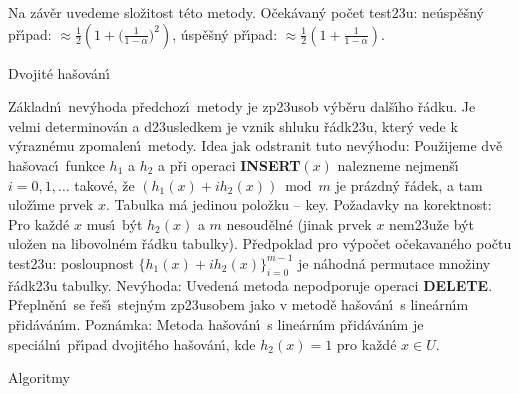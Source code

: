 \flushpar Na z\'av\v er uvedeme slo\v zitost t\'eto metody. O\v cek\'avan\'y 
po\v cet test\accent23u:\newline 
\phantom{---}ne\'usp\v e\v sn\'y p\v r\'\i pad: $\approx\frac 12(1+\big(\frac 
1{1-\alpha}\big)^2)$, \newline 
\phantom{---}\'usp\v e\v sn\'y p\v r\'\i pad: $\approx\frac 12(1+\frac 1{1-\alpha}
)$.

\heading
Dvojit\'e ha\v sov\'an\'\i
\endheading

\flushpar Z\'akladn\'\i\ nev\'yhoda p\v redchoz\'\i\ metody je zp\accent23usob 
v\'yb\v eru dal\-\v s\'\i\-ho \v r\'adku. Je velmi determinov\'an a 
d\accent23usledkem je vznik shluku \v r\'adk\accent23u, kter\'y 
vede k v\'yrazn\'emu zpomalen\'\i\ metody. \newline 
Idea jak odstranit tuto nev\'yhodu: Pou\v zijeme dv\v e 
ha\v sovac\'\i\ funkce $h_1$ a $h_2$ a p\v ri operaci {\bf INSERT$
(x)$ }
nalezneme nejmen\v s\'\i\ $i=0,1,\dots$ takov\'e, \v ze 
$(h_1(x)+ih_2(x))\bmod m$ je pr\'azdn\'y \v r\'adek, a tam ulo\v z\'\i me 
prvek $x$.\newline 
Tabulka m\'a jedinou polo\v zku -- key.\newline 
Po\v zadavky na korektnost: Pro ka\v zd\'e $x$ mus\'\i\ b\'yt $h_
2(x)$ a 
$m$ nesoud\v eln\'e (jinak prvek $x$ nem\accent23u\v ze b\'yt ulo\v zen 
na libovoln\'em \v r\'adku tabulky). \newline 
P\v redpoklad pro v\'ypo\v cet o\v cekavan\'eho po\v ctu test\accent23u: posloupnost 
$\{h_1(x)+ih_2(x)\}_{i=0}^{m-1}$ je n\'ahodn\'a permutace mno\v ziny 
\v r\'adk\accent23u tabulky.\newline 
Nev\'yhoda: Uveden\'a metoda nepodporuje operaci {\bf DELETE}. \newline 
P\v repln\v en\'\i\ se \v re\v s\'\i\ stejn\'ym zp\accent23usobem jako v 
metod\v e ha\v sov\'an\'\i\ s line\'arn\'\i m p\v rid\'av\'an\'\i m.\newline 
Pozn\'amka: Metoda ha\v sov\'an\'\i\ s line\'arn\'\i m p\v rid\'av\'an\'\i m je 
speci\'al\-n\'\i\ p\v r\'\i pad dvojit\'eho ha\v sov\'an\'\i , kde $
h_2(x)=1$ pro 
ka\v zd\'e $x\in U$.
\medskip

\subhead
Algoritmy
\endsubhead
\smallskip

